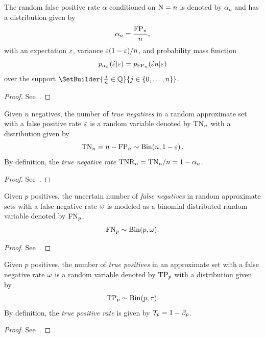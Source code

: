 \begin{theorem}
\label{thm:fpr}
The random false positive rate $\alpha$ conditioned on $\mathrm{N} = n$ is denoted by $\alpha_n$ and has a distribution given by
\begin{equation}
    \alpha_n = \frac{\mathrm{FP}_n}{n},
\end{equation}
with an expectation $\varepsilon$, variance $\varepsilon(1-\varepsilon) / n$, and probability mass function
\begin{equation}
	p_{\alpha_n}(\hat{\varepsilon} | \varepsilon) = p_{\mathrm{FP}_n}(\hat{\varepsilon} n | \varepsilon)
\end{equation}
over the support $\SetBuilder{ \frac{j}{n} \in \RatSet}{j \in \{0,\ldots,n\}}$.
\end{theorem}
\begin{proof}
See~\cite{bernoulliSets}.
\end{proof}

\begin{corollary}
\label{cor:tnbinom}
Given $n$ negatives, the number of \emph{true negatives} in a random approximate set with a false positive rate $\varepsilon$ is a random variable denoted by $\mathrm{TN}_n$ with a distribution given by
\begin{equation}
	\mathrm{TN}_n = n - \mathrm{FP}_n \sim \mathrm{Bin}\!\left(n, 1-\varepsilon\right).
\end{equation}
By definition, the \emph{true negative rate} $\mathrm{TNR}_n = \mathrm{TN}_n / n = 1 - \alpha_n$.
\end{corollary}
\begin{proof}
See~\cite{bernoulliSets}.
\end{proof}

\begin{theorem}
\label{thm:fnbinom}
Given $p$ positives, the uncertain number of \emph{false negatives} in random approximate sets with a false negative rate $\omega$ is modeled as a binomial distributed random variable denoted by $\mathrm{FN}_p$,
\begin{equation}
	\mathrm{FN}_p \sim \mathrm{Bin}(p, \omega).
\end{equation}
\end{theorem}
\begin{proof}
See~\cite{bernoulliSets}.
\end{proof}

\begin{corollary}
\label{cor:tpbinom}
Given $p$ positives, the number of \emph{true positives} in an approximate set
with a false negative rate $\omega$ is a random variable denoted by $\mathrm{TP}_p$
with a distribution given by
\begin{equation}
    \mathrm{TP}_p \sim \mathrm{Bin}(p, \tau).
\end{equation}
By definition, the \emph{true positive rate} is given by $\mathcal{T}_p = 1 -
\beta_p$.
\end{corollary}
\begin{proof}
See~\cite{bernoulliSets}.
\end{proof}
